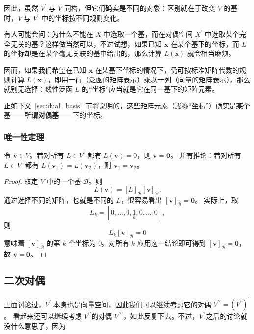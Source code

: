 因此，虽然 $V^\prime$ 与 $V$ 同构，但它们确实是不同的对象：区别就在于改变 $V$ 的基时，$V$ 与 $V^\prime$ 中的坐标按不同规则变化。

\begin{remark*}
    有人可能会问：为什么不能在 $X$ 中选取一个基，而在对偶空间 $X^\prime$ 中选取某个完全无关的基？这样做当然可以，不过试想，如果已知 $\mathbf{x}$ 在某个基下的坐标，而 $L$ 的坐标却是在某个毫无关联的基中给出的，那么计算 $L(\mathbf{x})$ 就会相当麻烦。

    因而，如果我们希望在已知 $\mathbf{x}$ 在某基下坐标的情况下，仍可按标准矩阵代数的规则计算 $L(\mathbf{x})$，即用一行（泛函的矩阵表示）乘以一列（向量的矩阵表示），那么就别无选择：线性泛函 $L$ 的“坐标”应当就是它在同一基下的矩阵元素。

    正如下文~\ref{sec:dual_basis}~节将说明的，这些矩阵元素（或称“坐标”）确实是某个基——所谓{\bf 对偶基}——下的坐标。
\end{remark*}

\subsubsection{唯一性定理}

\begin{lemma}\label{lem:uniqueness_of_functional}
    令 $\mathbf{v}\in V$。若对所有 $L\in V^\prime$ 都有 $L(\mathbf{v})=0$，则 $\mathbf{v}=\mathbf{0}$。
    并有推论：若对所有 $L\in V^\prime$ 都有 $L(\mathbf{v}_1)=L(\mathbf{v}_2)$，则 $\mathbf{v}_1=\mathbf{v}_2$。
\end{lemma}

\begin{proof}
    取定 $V$ 中的一个基 $\mathcal{B}$。则
    \[
        L(\mathbf{v})=[L]_{\mathcal{B}}[\mathbf{v}]_{\mathcal{B}}.
    \]
    通过选择不同的矩阵，也就是不同的 $L$，很容易看出 $[\mathbf{v}]_{\mathcal{B}}=\mathbf{0}$。
    实际上，取
    \[
        L_k=[0,\ldots,0,\underset{k}{1},0,\ldots,0],
    \]
    则 \[L_k[\mathbf{v}]_{\mathcal{B}}=0\] 意味着 $[\mathbf{v}]_{\mathcal{B}}$ 的第 $k$ 个坐标为 $0$。对所有 $k$ 应用这一结论即可得到 $[\mathbf{v}]_{\mathcal{B}}=\mathbf{0}$，故 $\mathbf{v}=\mathbf{0}$。
\end{proof}

\subsection{二次对偶}

上面讨论过，$V^\prime$ 本身也是向量空间，因此我们可以继续考虑它的对偶 $V^{\prime\prime}=(V^\prime)^\prime$。
看起来还可以继续考虑 $V^{\prime\prime}$的对偶 $V^{\prime\prime\prime}$，如此反复下去。不过，$V^{\prime\prime}$之后的讨论就没什么意思了，因为
\begin{center}
\end{center}

